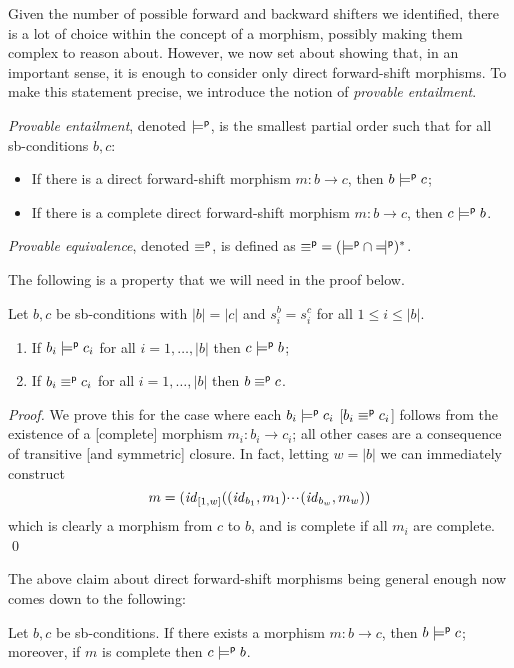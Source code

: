 %
Given the number of possible forward and backward shifters we identified, there is a lot of choice within the concept of a morphism, possibly making them complex to reason about. However, we now set about showing that, in an important sense, it is enough to consider only direct forward-shift morphisms. To make this statement precise, we introduce the notion of \emph{provable entailment}.
%
\begin{definition}
\emph{Provable entailment}, denoted $\models^{\mathsf p}$, is the smallest partial order such that for all sb-conditions $b,c$:
\begin{itemize}[topsep=\smallskipamount]
\item If there is a direct forward-shift morphism $m:b\to c$, then $b\models^{\mathsf p} c$;
\item If there is a complete direct forward-shift morphism $m:b\to c$, then $c\models^{\mathsf p} b$.
\end{itemize}
\emph{Provable equivalence}, denoted $\equiv^{\mathsf p}$, is defined as ${\pequiv}=({\pentails}\cap{\pentailedby})^*$.
\end{definition}
%
The following is a property that we will need in the proof below.
%
\begin{lemma}
Let $b,c$ be sb-conditions with $|b|=|c|$ and $s^b_i=s^c_i$ for all $1\leq i\leq |b|$.
\begin{enumerate}[topsep=\smallskipamount]
\item If $b_i\models^{\mathsf p} c_i$ for all $i=1,\ldots,|b|$ then $c\models^{\mathsf p} b$;
\item If $b_i\equiv^{\mathsf p} c_i$ for all $i=1,\ldots,|b|$ then $b\equiv^{\mathsf p} c$.
\end{enumerate}
\end{lemma}
%
\begin{proof}
We prove this for the case where each $b_i\models^{\mathsf p} c_i$ [$b_i\equiv^{\mathsf p} c_i$] follows from the existence of a [complete] morphism $m_i:b_i\to c_i$; all other cases are a consequence of transitive [and symmetric] closure. In fact, letting $w=|b|$ we can immediately construct
\[ m = (\mathit{id}_{[1,w]}((\mathit{id}_{b_1},m_1){\cdotp\mkern-2mu\cdotp\mkern-2mu\cdotp\mkern1mu} (\mathit{id}_{b_w},m_w)) \]
which is clearly a morphism from $c$ to $b$, and is complete if all $m_i$ are complete.
\qed
\end{proof}
%
The above claim about direct forward-shift morphisms being general enough now comes down to the following:
%
\begin{proposition}
Let $b,c$ be sb-conditions. If there exists a morphism $m:b\to c$, then $b\models^{\mathsf p} c$; moreover, if $m$ is complete then $c\models^{\mathsf p} b$.
\end{proposition}
